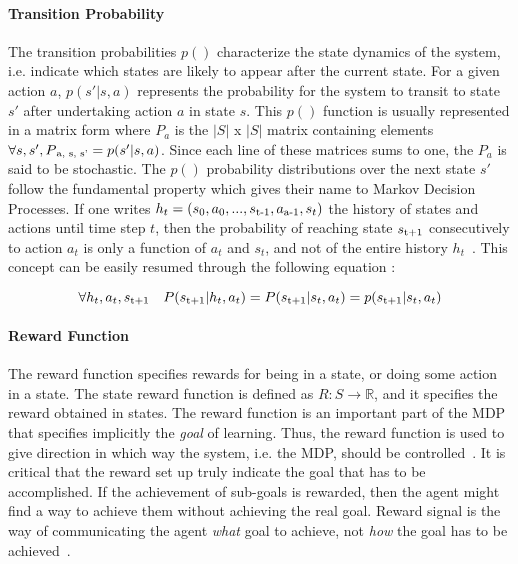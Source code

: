 \paragraph{Transition Probability} The transition probabilities $p()$ characterize the state dynamics of the system, i.e. indicate which states are likely to appear after the current state. For a given action $a$, $p(s'|s,a)$ represents the probability for the system to transit to state $s'$ after undertaking action $a$ in state $s$. This $p()$ function is usually represented in a matrix form where $P_a$ is the $|S|$ x $|S|$ matrix containing elements $\forall s, s', P\textsubscript{a, s, s'} = p(s'|s,a)$. Since each line of these matrices sums to one, the $P_a$ is said to be stochastic. The $p()$ probability distributions over the next state $s'$ follow the fundamental property which gives their name to Markov Decision Processes. If one writes $h_t = (s_0, a_0, ..., s\textsubscript{t-1}, a\textsubscript{a-1}, s_t)$ the history of states and actions until time step $t$, then the probability of reaching state $s\textsubscript{t+1}$ consecutively to action $a_t$ is only a function of $a_t$ and $s_t$, and not of the entire history $h_t$~\cite{Sigaud:2010:MDP:1841781}. This concept can be easily resumed through the following equation :

\begin{equation}
	\forall h_t, a_t, s\textsubscript{t+1} \quad P(s\textsubscript{t+1} | h_t, a_t) = P(s\textsubscript{t+1} | s_t, a_t) = p(s\textsubscript{t+1} | s_t, a_t)
\end{equation}

\paragraph{Reward Function} The reward function specifies rewards for being in a state, or doing some action in a state. The state reward function is defined as $R : S \rightarrow \mathbb{R}$, and it specifies the reward obtained in states. The reward function is an important part of the MDP that specifies implicitly the \textit{goal} of learning. Thus, the reward function is used to give direction in which way the system, i.e. the MDP, should be controlled~\cite{wiering2012reinforcement}. It is critical that the reward set up truly indicate the goal that has to be accomplished. If the achievement of sub-goals is rewarded, then the agent might find a way to achieve them without achieving the real goal. Reward signal is the way of communicating the agent \textit{what} goal to achieve, not \textit{how} the goal has to be achieved~\cite{SuttonBarto}.

